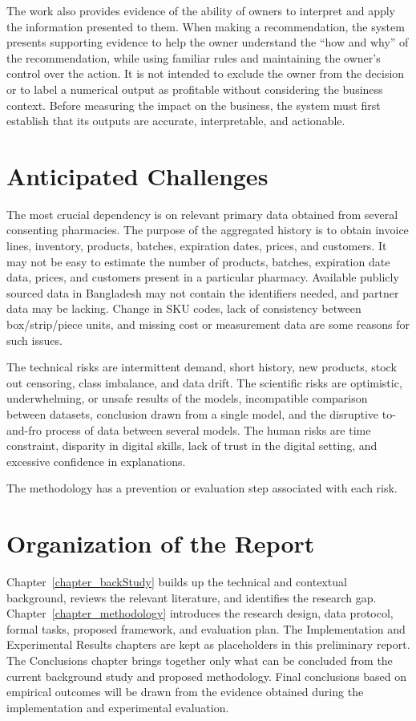 \documentclass[a4paper,11pt,oneside]{book}
\theoremstyle{plain}
\theoremstyle{definition}
\theoremstyle{remark}
\begin{document}
The work also provides evidence of the ability of owners to interpret and apply the information presented to them. When making a recommendation, the system presents supporting evidence to help the owner understand the ``how and why'' of the recommendation, while using familiar rules and maintaining the owner's control over the action. It is not intended to exclude the owner from the decision or to label a numerical output as profitable without considering the business context. Before measuring the impact on the business, the system must first establish that its outputs are accurate, interpretable, and actionable.


\section{Anticipated Challenges}

The most crucial dependency is on relevant primary data obtained from several consenting pharmacies. The purpose of the aggregated history is to obtain invoice lines, inventory, products, batches, expiration dates, prices, and customers. It may not be easy to estimate the number of products, batches, expiration date data, prices, and customers present in a particular pharmacy. Available publicly sourced data in Bangladesh may not contain the identifiers needed, and partner data may be lacking. Change in SKU codes, lack of consistency between box/strip/piece units, and missing cost or measurement data are some reasons for such issues.

The technical risks are intermittent demand, short history, new products, stock out censoring, class imbalance, and data drift. The scientific risks are optimistic, underwhelming, or unsafe results of the models, incompatible comparison between datasets, conclusion drawn from a single model, and the disruptive to-and-fro process of data between several models. The human risks are time constraint, disparity in digital skills, lack of trust in the digital setting, and excessive confidence in explanations.

The methodology has a prevention or evaluation step associated with each risk.

\section{Organization of the Report}

Chapter~\ref{chapter_backStudy} builds up the technical and contextual background, reviews the relevant literature, and identifies the research gap. Chapter~\ref{chapter_methodology} introduces the research design, data protocol, formal tasks, proposed framework, and evaluation plan. The Implementation and Experimental Results chapters are kept as placeholders in this preliminary report. The Conclusions chapter brings together only what can be concluded from the current background study and proposed methodology. Final conclusions based on empirical outcomes will be drawn from the evidence obtained during the implementation and experimental evaluation.
\end{document}
